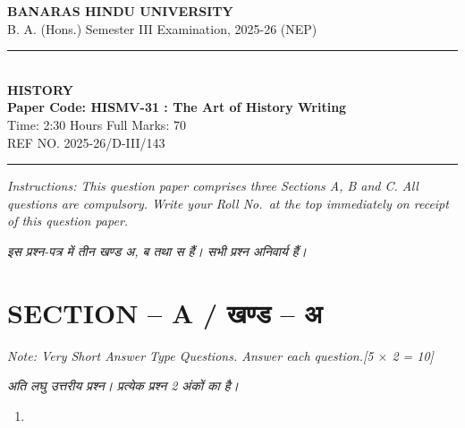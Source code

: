 \documentclass[11pt,a4paper]{article}
\newcommand{\pts}[1]{\hfill \textit{[#1]}}
\begin{document}
\begin{center}
  {\large\bfseries BANARAS HINDU UNIVERSITY}\\[2pt]
  {\normalsize B. A. (Hons.) Semester III Examination, 2025-26 (NEP)}\\[6pt]
  \rule{0.8\linewidth}{0.5pt}\\[6pt]
  {\large\bfseries HISTORY}\\[4pt]
  {\large\bfseries Paper Code: HISMV-31 : The Art of History Writing}\\[4pt]
  {\normalsize Time: 2:30 Hours \hfill Full Marks: 70}\\[2pt]
  {\small REF NO. 2025-26/D-III/143}
\end{center}
\rule{\linewidth}{0.4pt}
\smallskip

\noindent \textit{Instructions: This question paper comprises three Sections A, B and C. All questions are compulsory. Write your Roll No.\ at the top immediately on receipt of this question paper.}

\smallskip
\noindent \textit{इस प्रश्न-पत्र में तीन खण्ड अ, ब तथा स हैं। सभी प्रश्न अनिवार्य हैं।}

\bigskip

\section*{SECTION -- A / खण्ड -- अ}
\noindent \textit{Note: Very Short Answer Type Questions. Answer each question.}\pts{5 $\times$ 2 = 10}

\noindent \textit{अति लघु उत्तरीय प्रश्न। प्रत्येक प्रश्न 2 अंकों का है।}

\begin{enumerate}[label=\textbf{\arabic*.},leftmargin=*,itemsep=8pt]
  \item 
\end{enumerate}
\end{document}
